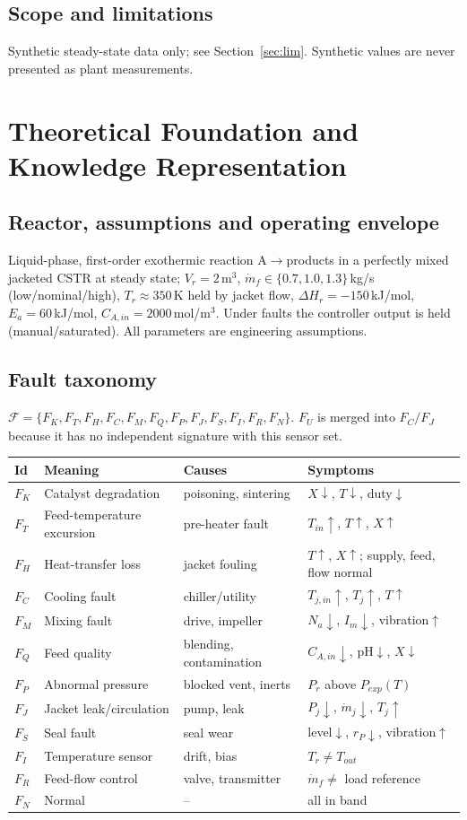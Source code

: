 \documentclass[11pt,a4paper]{article}
\begin{document}
\subsection{Scope and limitations}
Synthetic steady-state data only; see Section~\ref{sec:lim}. Synthetic values are never presented as plant measurements.

\section{Theoretical Foundation and Knowledge Representation}
\subsection{Reactor, assumptions and operating envelope}
Liquid-phase, first-order exothermic reaction A$\to$products in a perfectly mixed jacketed CSTR at steady state; $V_r=2$\,m$^3$, $\dot m_f\in\{0.7,1.0,1.3\}$\,kg/s (low/nominal/high), $T_r\approx350$\,K held by jacket flow, $\Delta H_r=-150$\,kJ/mol, $E_a=60$\,kJ/mol, $C_{A,in}=2000$\,mol/m$^3$. Under faults the controller output is held (manual/saturated). All parameters are engineering assumptions.
\subsection{Fault taxonomy}
$\mathcal F=\{F_K,F_T,F_H,F_C,F_M,F_Q,F_P,F_J,F_S,F_I,F_R,F_N\}$. $F_U$ is merged into $F_C/F_J$ because it has no independent signature with this sensor set.
\begin{longtable}{p{.6cm}p{3.4cm}p{3.6cm}p{4.2cm}}\toprule Id&Meaning&Causes&Symptoms\\\midrule\endhead
$F_K$&Catalyst degradation&poisoning, sintering&$X\downarrow$, $T\downarrow$, duty$\downarrow$\\
$F_T$&Feed-temperature excursion&pre-heater fault&$T_{in}\uparrow$, $T\uparrow$, $X\uparrow$\\
$F_H$&Heat-transfer loss&jacket fouling&$T\uparrow$, $X\uparrow$; supply, feed, flow normal\\
$F_C$&Cooling fault&chiller/utility&$T_{j,in}\uparrow$, $T_j\uparrow$, $T\uparrow$\\
$F_M$&Mixing fault&drive, impeller&$N_a\downarrow$, $I_m\downarrow$, vibration$\uparrow$\\
$F_Q$&Feed quality&blending, contamination&$C_{A,in}\downarrow$, pH$\downarrow$, $X\downarrow$\\
$F_P$&Abnormal pressure&blocked vent, inerts&$P_r$ above $P_{exp}(T)$\\
$F_J$&Jacket leak/circulation&pump, leak&$P_j\downarrow$, $\dot m_j\downarrow$, $T_j\uparrow$\\
$F_S$&Seal fault&seal wear&level$\downarrow$, $r_P\downarrow$, vibration$\uparrow$\\
$F_I$&Temperature sensor&drift, bias&$T_r\neq T_{out}$\\
$F_R$&Feed-flow control&valve, transmitter&$\dot m_f\neq$ load reference\\
$F_N$&Normal&--&all in band\\\bottomrule\end{longtable}
\end{document}

